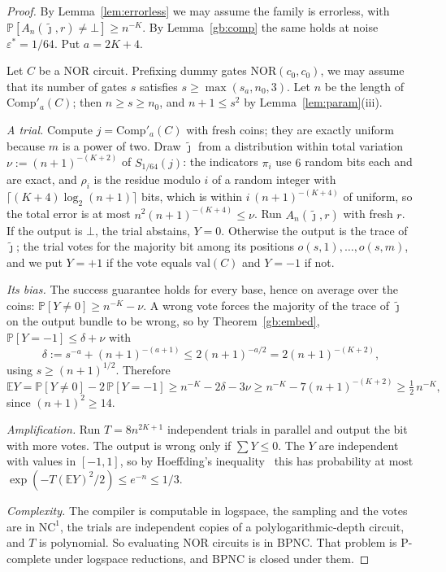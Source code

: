 \documentclass[11pt]{amsart}
\theoremstyle{definition}
\theoremstyle{remark}
\newcommand{\eps}{\varepsilon}
\newcommand{\jt}{\tilde{\jmath}}
\newcommand{\NOR}{\mathrm{NOR}}
\newcommand{\val}{\mathrm{val}}
\newcommand{\PP}{\mathbb{P}}
\newcommand{\EE}{\mathbb{E}}
\newcommand{\Comp}{\mathrm{Comp}}
\begin{document}
\begin{proof}
By Lemma~\ref{lem:errorless} we may assume the family is errorless, with
$\PP[A_n(\jt,r)\ne\bot]\ge n^{-K}$. By Lemma~\ref{gb:comp} the same holds at noise
$\eps^*=1/64$. Put $a=2K+4$.

Let $C$ be a NOR circuit. Prefixing dummy gates $\NOR(c_0,c_0)$, we may assume that its number of
gates $s$ satisfies $s\ge\max(s_a,n_0,3)$. Let $n$ be the length of $\Comp'_a(C)$; then
$n\ge s\ge n_0$, and $n+1\le s^2$ by Lemma~\ref{lem:param}(iii).

\emph{A trial.} Compute $j=\Comp'_a(C)$ with fresh coins; they are exactly uniform because $m$ is
a power of two. Draw $\jt$ from a distribution within total variation $\nu:=(n+1)^{-(K+2)}$ of
$S_{1/64}(j)$: the indicators $\pi_i$ use $6$ random bits each and are exact, and $\rho_i$ is the
residue modulo $i$ of a random integer with $\lceil(K+4)\log_2(n+1)\rceil$ bits, which is within
$i\,(n+1)^{-(K+4)}$ of uniform, so the total error is at most $n^2(n+1)^{-(K+4)}\le\nu$. Run
$A_n(\jt,r)$ with fresh $r$. If the output is $\bot$, the trial abstains, $Y=0$. Otherwise the
output is the trace of $\jt$; the trial votes for the majority bit among its positions
$o(s,1),\dots,o(s,m)$, and we put $Y=+1$ if the vote equals $\val(C)$ and $Y=-1$ if not.

\emph{Its bias.} The success guarantee holds for every base, hence on average over the coins:
$\PP[Y\ne0]\ge n^{-K}-\nu$. A wrong vote forces the majority of the trace of $\jt$ on the output
bundle to be wrong, so by Theorem~\ref{gb:embed}, $\PP[Y=-1]\le\delta+\nu$ with
\[
\delta:=s^{-a}+(n+1)^{-(a+1)}\le2(n+1)^{-a/2}=2(n+1)^{-(K+2)},
\]
using $s\ge(n+1)^{1/2}$. Therefore
\[
\EE Y=\PP[Y\ne0]-2\,\PP[Y=-1]\ge n^{-K}-2\delta-3\nu\ge n^{-K}-7(n+1)^{-(K+2)}\ge\tfrac12\,n^{-K},
\]
since $(n+1)^2\ge14$.

\emph{Amplification.} Run $T=8n^{2K+1}$ independent trials in parallel and output the bit with
more votes. The output is wrong only if $\sum Y\le0$. The $Y$ are independent with values in
$[-1,1]$, so by Hoeffding's inequality~\cite{hoeffding} this has probability at most
$\exp(-T(\EE Y)^2/2)\le e^{-n}\le1/3$.

\emph{Complexity.} The compiler is computable in logspace, the sampling and the votes are in
$\mathrm{NC}^1$, the trials are independent copies of a polylogarithmic-depth circuit, and $T$
is polynomial. So evaluating NOR circuits is in BPNC. That problem is P-complete under logspace
reductions, and BPNC is closed under them.
\end{proof}
\end{document}
